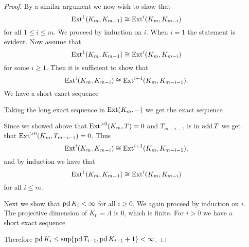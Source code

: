 \begin{theorem}
\begin{proof}
		By a similar argument we now wish to show that $$\operatorname{Ext}^1(K_m, K_{m-1}) \cong \operatorname{Ext}^{i}(K_m, K_{m-i})$$ for all $1 \leq i \leq m$. We proceed by induction on $i$. When $i=1$ the statement is evident. Now assume that $$\operatorname{Ext}^1(K_m, K_{m-1}) \cong \operatorname{Ext}^{i}(K_m, K_{m-i})$$ for some $i \geq 1$. Then it is sufficient to show that $$ \operatorname{Ext}^{i}(K_m, K_{m-i}) \cong  \operatorname{Ext}^{i+1}(K_m, K_{m-i-1}).$$
		We have a short exact sequence
		\begin{center}
		\end{center}
		Taking the long exact sequence in $\operatorname{Ext}(K_m, -)$ we get the exact sequence
		\begin{center}
		\end{center}
		Since we showed above that $\operatorname{Ext}^{>0}(K_m, T) = 0$ and $T_{m-i-1}$ is in $\operatorname{add} T$ we get that $\operatorname{Ext}^{>0}(K_m, T_{m-i-1}) = 0$. Thus 
		$$\operatorname{Ext}^{i}(K_m, K_{m-i}) \cong \operatorname{Ext}^{i+1}(K_m, K_{m-i-1}),$$ 
		and by induction we have that 
		$$\operatorname{Ext}^1(K_m, K_{m-1}) \cong \operatorname{Ext}^{i}(K_m, K_{m-i})$$ for all $i \leq m$.
		
		Next we show that $\operatorname{pd} K_i < \infty$ for all $i \geq 0$. We again proceed by induction on $i$. The projective dimension of $K_0=\Lambda$ is 0, which is finite. For $i>0$ we have a short exact sequence
		\begin{center}
		\end{center}
		Therefore $\operatorname{pd} K_i \leq \sup\{\operatorname{pd} T_{i-1}, \operatorname{pd} K_{i-1} + 1\} < \infty$.
		

\end{proof}
\end{theorem}

